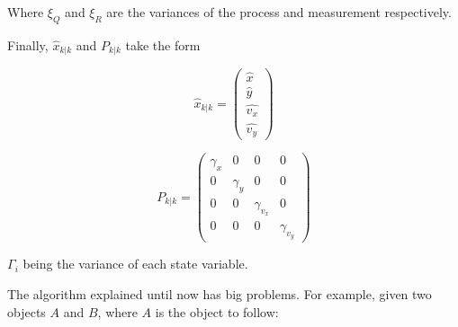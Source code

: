 Where $\xi_Q$ and $\xi_R$ are the variances of the process and measurement respectively.


Finally, $\hat{x}_{k | k}$ and $P_{k | k}$ take the form

\begin{equation}
\hat{x}_{k|k} = 
\begin{pmatrix}
\hat{x}\\
\hat{y}\\
\hat{v_x}\\
\hat{v_y}
\end{pmatrix}
\end{equation}

\begin{equation}
P_{k|k} = 
\begin{pmatrix}
\gamma_{x} & 0 & 0  & 0\\
0 & \gamma_{y}  & 0 & 0\\
0 & 0  & \gamma_{v_x}  & 0\\
0 & 0  & 0  & \gamma_{v_y} 
\end{pmatrix}
\end{equation}

$\Gamma_{i}$ being the variance of each state variable.

The algorithm explained until now has big problems. For example, given two objects $A$ and $B$, where $A$ is the object to follow:


